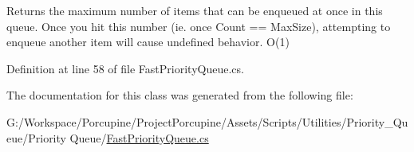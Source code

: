 Returns the maximum number of items that can be enqueued at once in this queue. Once you hit this number (ie. once Count == Max\+Size), attempting to enqueue another item will cause undefined behavior. O(1) 



Definition at line 58 of file Fast\+Priority\+Queue.\+cs.



The documentation for this class was generated from the following file\+:\begin{DoxyCompactItemize}
\item 
G\+:/\+Workspace/\+Porcupine/\+Project\+Porcupine/\+Assets/\+Scripts/\+Utilities/\+Priority\+\_\+\+Queue/\+Priority Queue/\hyperlink{_fast_priority_queue_8cs}{Fast\+Priority\+Queue.\+cs}\end{DoxyCompactItemize}
